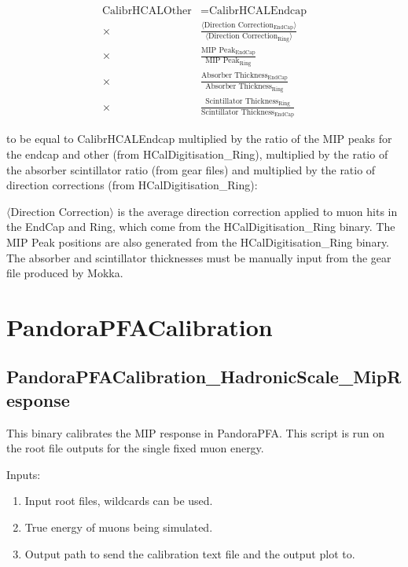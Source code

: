 \documentclass[11pt, oneside]{article}   	%
\begin{document}
\begin{equation}
\begin{split}
\text{CalibrHCALOther} & = \text{CalibrHCALEndcap} \\ \times &  \frac{\langle \text{Direction Correction}_\text{EndCap} \rangle}{\langle \text{Direction Correction}_\text{Ring} \rangle} \\ \times & \frac{ \text{MIP Peak}_\text{EndCap} }{ \text{MIP Peak}_\text{Ring} } \\ \times & \frac{ \text{Absorber Thickness}_\text{EndCap} }{ \text{Absorber Thickness}_\text{Ring} } \\ \times & \frac{ \text{Scintillator Thickness}_\text{Ring} }{ \text{Scintillator Thickness}_\text{EndCap}}
\end{split}
\end{equation}

to be equal to CalibrHCALEndcap multiplied by the ratio of the MIP peaks for the endcap and other (from HCalDigitisation\_Ring), multiplied by the ratio of the absorber  scintillator ratio (from gear files) and multiplied by the ratio of direction corrections (from HCalDigitisation\_Ring):

$\langle \text{Direction Correction} \rangle$ is the average direction correction applied to muon hits in the EndCap and Ring, which come from the HCalDigitisation\_Ring binary.  The MIP Peak positions are also generated from the HCalDigitisation\_Ring binary.  The absorber and scintillator thicknesses must be manually input from the gear file produced by Mokka.

\section{PandoraPFACalibration}

\subsection{PandoraPFACalibration\_HadronicScale\_MipResponse}

This binary calibrates the MIP response in PandoraPFA.  This script is run on the root file outputs for the single fixed muon energy.

Inputs:
\begin{enumerate}
\item Input root files, wildcards can be used.
\item True energy of muons being simulated.
\item Output path to send the calibration text file and the output plot to.
\end{enumerate}
\end{document}
